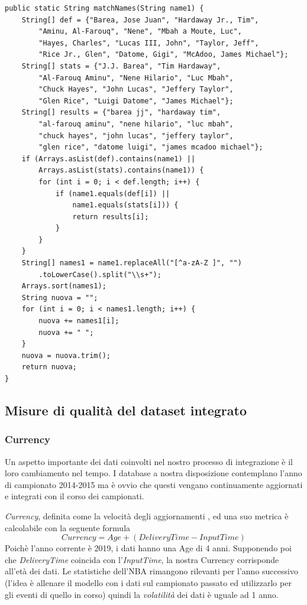 \begin{code}
\begin{verbatim}
public static String matchNames(String name1) {
	String[] def = {"Barea, Jose Juan", "Hardaway Jr., Tim", 
		"Aminu, Al-Farouq", "Nene", "Mbah a Moute, Luc",
		"Hayes, Charles", "Lucas III, John", "Taylor, Jeff",
		"Rice Jr., Glen", "Datome, Gigi", "McAdoo, James Michael"};
	String[] stats = {"J.J. Barea", "Tim Hardaway", 
		"Al-Farouq Aminu", "Nene Hilario", "Luc Mbah",
		"Chuck Hayes", "John Lucas", "Jeffery Taylor",
		"Glen Rice", "Luigi Datome", "James Michael"};
	String[] results = {"barea jj", "hardaway tim", 
		"al-farouq aminu", "nene hilario", "luc mbah",
		"chuck hayes", "john lucas", "jeffery taylor",
		"glen rice", "datome luigi", "james mcadoo michael"};
	if (Arrays.asList(def).contains(name1) || 
		Arrays.asList(stats).contains(name1)) {
		for (int i = 0; i < def.length; i++) {
			if (name1.equals(def[i]) || 
				name1.equals(stats[i])) {
				return results[i];
			}
		}  
	}
	String[] names1 = name1.replaceAll("[^a-zA-Z ]", "")
		.toLowerCase().split("\\s+");
	Arrays.sort(names1);
	String nuova = "";
	for (int i = 0; i < names1.length; i++) {
		nuova += names1[i];
		nuova += " ";
	}
	nuova = nuova.trim();
	return nuova;
}
\end{verbatim}
\end{code}


\subsection{Misure di qualità del dataset integrato}

\subsubsection{Currency}
Un aspetto importante dei dati coinvolti nel nostro processo di integrazione è il loro cambiamento nel tempo. I database a nostra disposizione contemplano l’anno di campionato 2014-2015 ma è ovvio che questi vengano continuamente aggiornati e integrati con il corso dei campionati.

\textit{Currency}, definita come la velocità degli aggiornamenti \cite{batini2006}, ed una suo metrica è calcolabile con la seguente formula\cite{doi:10.1287/mnsc.44.4.462}
$$Currency = Age + (DeliveryTime - InputTime)$$
Poichè l’anno corrente è 2019, i dati hanno una Age di 4 anni. Supponendo poi che \textit{DeliveryTime} coincida con l’\textit{InputTime}, la nostra Currency corrisponde all’età dei dati.
Le statistiche dell’NBA rimangono rilevanti per l’anno successivo (l'idea è allenare il modello con i dati sul campionato passato ed utilizzarlo per gli eventi di quello in corso) quindi la \textit{volatilità} dei dati è uguale ad 1 anno.

